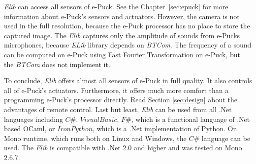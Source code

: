   {\it Elib} can access all sensors of e-Puck. See the Chapter~\ref{sec:epuck} 
  for more information about e-Puck's sensors and actuators.
  However, the camera is not used in the full resolution,
  because the e-Puck processor has no place to store the captured image.
  The {\it Elib} captures only the amplitude of sounds from e-Pucks microphones,
  because {\it ELib} library depends on {\it BTCom}.
  The frequency of a sound can be computed on e-Puck
  using Fast Fourier Transformation on e-Puck, 
  but the {\it BTCom} does not implement it.

  To conclude, {\it Elib} offers almost all sensors of e-Puck in full quality. 
  It also controls all of e-Puck's actuators.
  Furthermore, it offers much more comfort than a programming e-Puck's processor directly. 
  Read Section \ref{sec:design} about the advantages
  of remote control. 
  Last but least, {\it Elib} can be used from all .Net languages 
  including $C\#$, $Visual Basic$, $F\#$,
  which is a functional language of .Net based OCaml,
  or $Iron Python$, which is a .Net implementation of Python. On Mono runtime, 
  which runs both on Linux and Windows, the $C\#$ language can be used.
  The {\it Elib} is compatible with .Net 2.0 \cite{net} and higher 
  and was tested on Mono \cite{mono} 2.6.7.

